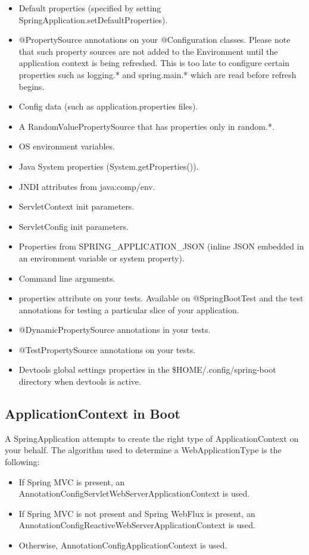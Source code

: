 \documentclass{scrartcl}
\begin{document}
\begin{itemize}
    \item Default properties (specified by setting SpringApplication.setDefaultProperties).
    \item @PropertySource annotations on your @Configuration classes. Please note that such property sources are not added to the Environment until the application context is being refreshed. This is too late to configure certain properties such as logging.* and spring.main.* which are read before refresh begins.
    \item Config data (such as application.properties files).
    \item A RandomValuePropertySource that has properties only in random.*.
    \item OS environment variables.
    \item Java System properties (System.getProperties()).
    \item JNDI attributes from java:comp/env.
    \item ServletContext init parameters.
    \item ServletConfig init parameters.
    \item Properties from SPRING\_APPLICATION\_JSON (inline JSON embedded in an environment variable or system property).
    \item Command line arguments.
    \item properties attribute on your tests. Available on @SpringBootTest and the test annotations for testing a particular slice of your application.
    \item @DynamicPropertySource annotations in your tests.
    \item @TestPropertySource annotations on your tests.
    \item Devtools global settings properties in the \$HOME/.config/spring-boot directory when devtools is active.
\end{itemize}

\subsection{ApplicationContext in Boot}

A SpringApplication attempts to create the right type of ApplicationContext on your behalf. The algorithm used to determine a WebApplicationType is the following:

\begin{itemize}
    \item If Spring MVC is present, an AnnotationConfigServletWebServerApplicationContext is used.
    \item If Spring MVC is not present and Spring WebFlux is present, an AnnotationConfigReactiveWebServerApplicationContext is used.
    \item Otherwise, AnnotationConfigApplicationContext is used.
\end{itemize}
\end{document}
